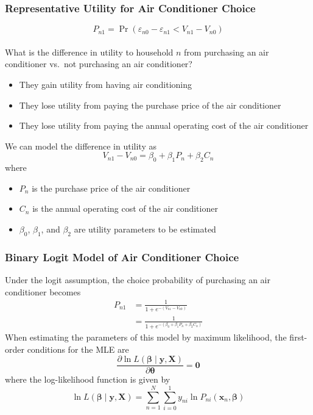 \documentclass{beamer}\usepackage[]{graphicx}\usepackage[]{color}
\begin{document}
\begin{frame}\frametitle{Representative Utility for Air Conditioner Choice}
    \vspace{-2ex}
    $$P_{n1} = \Pr(\varepsilon_{n0} - \varepsilon_{n1} < V_{n1} - V_{n0})$$ \\
    \vspace{1ex}
    What is the difference in utility to household $n$ from purchasing an air conditioner vs.\ not purchasing an air conditioner?
    \begin{itemize}
        \item They gain utility from having air conditioning
        \item They lose utility from paying the purchase price of the air conditioner
        \item They lose utility from paying the annual operating cost of the air conditioner
    \end{itemize}
    \vspace{2ex}
    We can model the difference in utility as
    $$V_{n1} - V_{n0} = \beta_0 + \beta_1 P_n + \beta_2 C_n$$
    where
    \begin{itemize}
        \item $P_n$ is the purchase price of the air conditioner
        \item $C_n$ is the annual operating cost of the air conditioner
        \item $\beta_0$, $\beta_1$, and $\beta_2$ are utility parameters to be estimated
    \end{itemize}
\end{frame}

\begin{frame}\frametitle{Binary Logit Model of Air Conditioner Choice}
    Under the logit assumption, the choice probability of purchasing an air conditioner becomes
    \begin{align*}
        P_{n1} & = \frac{1}{1 + e^{-(V_{n1} - V_{n0})}} \\
        & = \frac{1}{1 + e^{-(\beta_0 + \beta_1 P_n + \beta_2 C_n)}}
    \end{align*}
    When estimating the parameters of this model by maximum likelihood, the first-order conditions for the MLE are
    $$\frac{\partial \ln L(\bm{\beta} \mid \bm{y}, \bm{X})}{\partial \bm{\theta}} = \bm{0}$$
    where the log-likelihood function is given by
    $$\ln L(\bm{\beta} \mid \bm{y}, \bm{X}) = \sum_{n = 1}^N \sum_{i = 0}^1 y_{ni} \ln P_{ni}(\bm{x}_n, \bm{\beta})$$
\end{frame}
\end{document}
